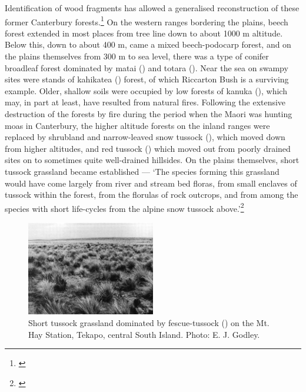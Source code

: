 Identification of wood fragments has allowed a generalised reconstruction of these former Canterbury forests.\footnote{\cite{molloy1969recent}}
On the western ranges bordering the plains, beech forest extended in most places from tree line down to about 1000 m altitude.
Below this, down to about 400 m, came a mixed beech-podocarp forest, and on the plains themselves from 300 m to sea level, there was a type of conifer broadleaf forest dominated by matai () and totara ().
Near the sea on swampy sites were stands of kahikatea () forest, of which Riccarton Bush is a surviving example.
Older, shallow soils were occupied by low forests of kanuka (), which may, in part at least, have resulted from natural fires.
Following the extensive destruction of the forests by fire during the period when the Maori was hunting moas in Canterbury, the higher altitude forests on the inland ranges were replaced by shrubland and narrow-leaved snow tussock (), which moved down from higher altitudes, and red tussock () which moved out from poorly drained sites on to sometimes quite well-drained hillsides.
On the plains themselves, short tussock grassland became established — `The species forming this grassland would have come largely from river and stream bed floras, from small enclaves of tussock within the forest, from the florulas of rock outcrops, and from among the species with short life-cycles from the alpine snow tussock above.'\footnote{\cite{connor1969montane}}

\begin{figure}
	\includegraphics[width=0.5\textwidth]{graphics/figure81short-tussock.jpg}
	\centering
	\caption[Short tussock grassland dominated by fescue-tussock]{Short tussock grassland dominated by fescue-tussock () on the Mt.
    Hay Station, Tekapo, central South Island.
    Photo:  E. J. Godley.}
	\label{fig:81short--tussock}
\end{figure}

